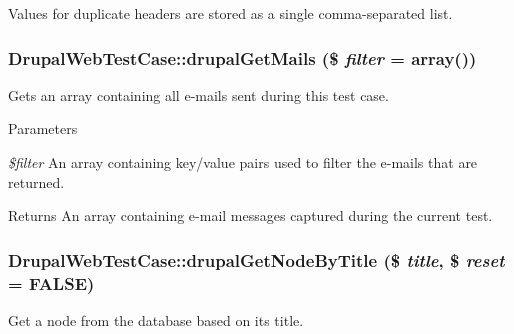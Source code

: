 Values for duplicate headers are stored as a single comma-\/separated list. \hypertarget{classDrupalWebTestCase_af2c147ab7789a251a27aa88a70282432}{
\subsubsection[{drupalGetMails}]{\setlength{\rightskip}{0pt plus 5cm}DrupalWebTestCase::drupalGetMails (\$ {\em filter} = {\ttfamily array()})}}
\label{classDrupalWebTestCase_af2c147ab7789a251a27aa88a70282432}
Gets an array containing all e-\/mails sent during this test case.


\begin{DoxyParams}{Parameters}
\item[{\em \$filter}]An array containing key/value pairs used to filter the e-\/mails that are returned. \end{DoxyParams}
\begin{DoxyReturn}{Returns}
An array containing e-\/mail messages captured during the current test. 
\end{DoxyReturn}
\hypertarget{classDrupalWebTestCase_aa725a4afdef576800747172fdf445735}{
\subsubsection[{drupalGetNodeByTitle}]{\setlength{\rightskip}{0pt plus 5cm}DrupalWebTestCase::drupalGetNodeByTitle (\$ {\em title}, \/  \$ {\em reset} = {\ttfamily FALSE})}}
\label{classDrupalWebTestCase_aa725a4afdef576800747172fdf445735}
Get a node from the database based on its title.


